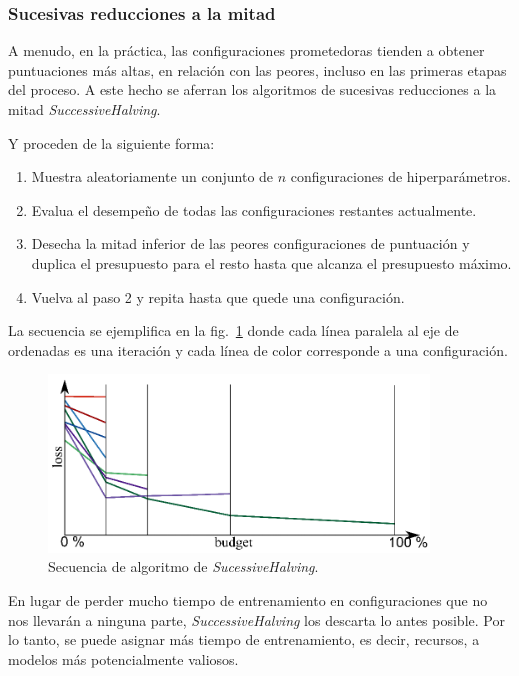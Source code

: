 \documentclass[a4paper,12pt]{article}
\begin{document}
\subsubsection{Sucesivas reducciones a la mitad}
A menudo, en la práctica, las configuraciones prometedoras tienden a obtener puntuaciones más altas, en relación con las peores, incluso en las primeras etapas del proceso. A este hecho se aferran los algoritmos de sucesivas reducciones a la mitad \textit{SuccessiveHalving}.

Y proceden de la siguiente forma:
\begin{enumerate}
	\item Muestra aleatoriamente un conjunto de $n$ configuraciones de hiperparámetros.
	\item Evalua el desempeño de todas las configuraciones restantes actualmente.
	\item Desecha la mitad inferior de las peores configuraciones de puntuación y duplica el presupuesto para el resto hasta que alcanza el presupuesto máximo.
	\item Vuelva al paso 2 y repita hasta que quede una configuración.
\end{enumerate}

La secuencia se ejemplifica en la fig.~\ref{fig:sh} donde cada línea paralela al eje de ordenadas es una iteración y cada línea de color corresponde a una configuración.

\begin{figure}[H]
	\begin{center}
	\includegraphics[width=0.9\textwidth]{sucessive_halving.png}
  	\caption{Secuencia de algoritmo de \textit{SucessiveHalving}.}
  	\label{fig:sh}
  	\end{center}
\end{figure}

En lugar de perder mucho tiempo de entrenamiento en configuraciones que no nos llevarán a ninguna parte, \textit{SuccessiveHalving} los descarta lo antes posible. Por lo tanto, se puede asignar más tiempo de entrenamiento, es decir, recursos, a modelos más potencialmente valiosos.
\end{document}
